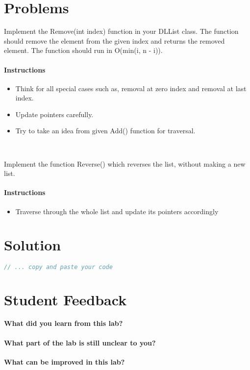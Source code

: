 \documentclass[11pt,fleqn]{book} %
\begin{document}
\section{Problems}
\begin{problem}
  Implement the Remove(int index) function in your DLList class. The function should remove the element from the given index and returns the removed element. The function should run in O(min(i, n - i)).
  \paragraph{Instructions}
  \begin{itemize}
  \item Think for all special cases such as, removal at zero index and removal at last index.
  \item Update pointers carefully.
  \item Try to take an idea from given Add() function for traversal.
  \end{itemize}
\end{problem}
~\\
\begin{problem}
  Implement the function Reverse() which reverses the list, without making a new list.
  \paragraph{Instructions}
  \begin{itemize}
  \item Traverse through the whole list and update its pointers accordingly
  \end{itemize}
\end{problem}

\newpage
\section{Solution}
\begin{lstlisting}[language=C++]
  // ... copy and paste your code
\end{lstlisting}

\newpage
\section{Student Feedback}
\textbf{What did you learn from this lab?}\\
\noindent\fbox{\parbox{\textwidth}{
  }
}\\
\textbf{What part of the lab is still unclear to you?}\\
\noindent\fbox{\parbox{\textwidth}{
  }
}\\
\textbf{What can be improved in this lab?}\\ 
\noindent\fbox{\parbox{\textwidth}{
  }
}\\
\end{document}
